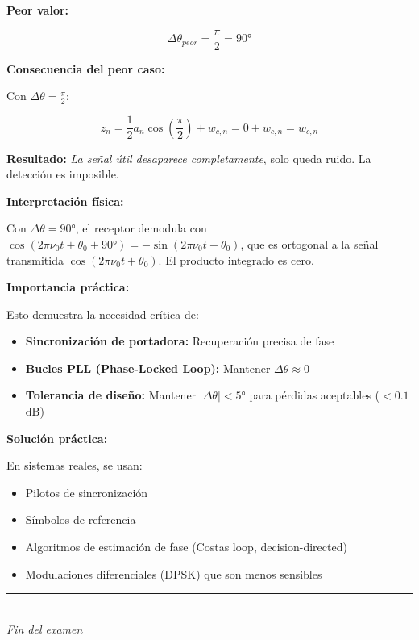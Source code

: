 \documentclass[11pt,a4paper]{article}
\begin{document}
\textbf{Peor valor:}

\[
\boxed{\Delta\theta_{peor} = \frac{\pi}{2} = 90°}
\]

\textbf{Consecuencia del peor caso:}

Con $\Delta\theta = \frac{\pi}{2}$:

\[
z_n = \frac{1}{2} a_n \cos\left(\frac{\pi}{2}\right) + w_{c,n} = 0 + w_{c,n} = w_{c,n}
\]

\textbf{Resultado:} \textit{La se\~nal \'util desaparece completamente}, solo queda ruido. La detecci\'on es imposible.

\textbf{Interpretaci\'on f\'isica:}

Con $\Delta\theta = 90°$, el receptor demodula con $\cos(2\pi\nu_0 t + \theta_0 + 90°) = -\sin(2\pi\nu_0 t + \theta_0)$, que es ortogonal a la se\~nal transmitida $\cos(2\pi\nu_0 t + \theta_0)$. El producto integrado es cero.

\textbf{Importancia pr\'actica:}

Esto demuestra la necesidad cr\'itica de:
\begin{itemize}
    \item \textbf{Sincronizaci\'on de portadora:} Recuperaci\'on precisa de fase
    \item \textbf{Bucles PLL (Phase-Locked Loop):} Mantener $\Delta\theta \approx 0$
    \item \textbf{Tolerancia de dise\~no:} Mantener $|\Delta\theta| < 5°$ para p\'erdidas aceptables ($< 0.1$ dB)
\end{itemize}

\textbf{Soluci\'on pr\'actica:}

En sistemas reales, se usan:
\begin{itemize}
    \item Pilotos de sincronizaci\'on
    \item S\'imbolos de referencia
    \item Algoritmos de estimaci\'on de fase (Costas loop, decision-directed)
    \item Modulaciones diferenciales (DPSK) que son menos sensibles
\end{itemize}



\vspace{1cm}
\begin{center}
\rule{0.8\linewidth}{0.4pt}\\
\textit{Fin del examen}
\end{center}
\end{document}
